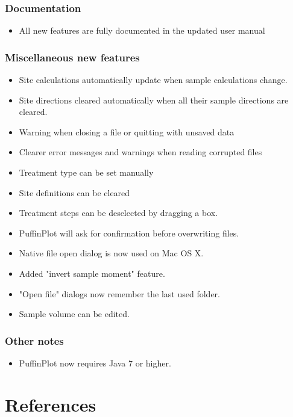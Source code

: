 \documentclass[a4paper,british]{article}
\begin{document}
\subsubsection{Documentation}
\label{sec-1-6}
\begin{itemize}
\item All new features are fully documented in the updated user manual
\end{itemize}

\subsubsection{Miscellaneous new features}
\label{sec-1-7}
\begin{itemize}
\item Site calculations automatically update when sample calculations
change.
\item Site directions cleared automatically when all their sample
directions are cleared.
\item Warning when closing a file or quitting with unsaved data
\item Clearer error messages and warnings when reading corrupted files
\item Treatment type can be set manually
\item Site definitions can be cleared
\item Treatment steps can be deselected by dragging a box.
\item PuffinPlot will ask for confirmation before overwriting files.
\item Native file open dialog is now used on Mac OS X.
\item Added "invert sample moment" feature.
\item "Open file" dialogs now remember the last used folder.
\item Sample volume can be edited.
\end{itemize}

\subsubsection{Other notes}
\label{sec-1-8}
\begin{itemize}
\item PuffinPlot now requires Java 7 or higher.
\end{itemize}

\clearpage
\renewcommand*{\refname}{\vspace{-1cm}} 
\section{References}


\end{document}

